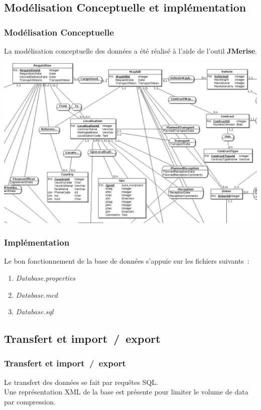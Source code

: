 \subsection[Modélisation Conceptuelle et implémentation]{Modélisation Conceptuelle et implémentation}
\begin{frame}
\frametitle{Modélisation Conceptuelle}
La modélisation conceptuelle des données a été réalisé à l'aide de l'outil \textbf{JMerise}.\\
\begin{center}
\includegraphics[scale=0.15]{Images/DatabaseSize}
\end{center}
\end{frame}

\begin{frame}
\frametitle{Implémentation}
Le bon fonctionnement de la base de données s'appuie sur les fichiers suivants~:
\begin{enumerate}
	\item<2-> \emph{Database.properties}
	\item<3-> \emph{Database.mcd}
	\item<4-> \emph{Database.sql}
\end{enumerate}
\end{frame}

\subsection[Transfert et import~/~export]{Transfert et import~/~export}
\begin{frame}
\frametitle{Transfert et import~/~export}
Le transfert des données se fait par requêtes SQL.\\
Une représentation XML de la base est présente pour limiter le volume de data par compression.\\
\end{frame}

